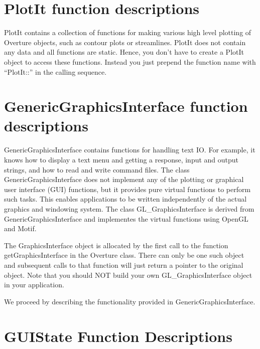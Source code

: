 \documentclass{article}
\begin{document}
\clearpage %

\vfill\eject
\section{PlotIt function descriptions}

PlotIt contains a collection of functions for making various high
level plotting of Overture objects,
such as contour plots or streamlines. PlotIt does not contain any data
and all functions are static. Hence, you don't have to create a PlotIt
object to access these functions. Instead you just prepend the
function name with ``PlotIt::'' in the calling sequence.



\vfill\eject
\section{GenericGraphicsInterface function descriptions}

GenericGraphicsInterface contains functions for handling text IO. For
example, it knows how to display a text menu and getting a response,
input and output strings, and how to read and write command files. The
class GenericGraphicsInterface does not implement any of the plotting
or graphical user interface (GUI) functions, but it provides pure
virtual functions to perform such tasks. This enables applications to
be written independently of the actual graphics and windowing
system. The class GL\_GraphicsInterface is derived from
GenericGraphicsInterface and implementes the virtual functions using
OpenGL and Motif.

The GraphicsInterface object is allocated by the first call to the function
getGraphicsInterface in the Overture class. There can only be one such
object and subsequent calls to that function will just return a
pointer to the original object. Note that you should NOT build your
own GL\_GraphicsInterface object in your application.

We proceed by describing the functionality provided in GenericGraphicsInterface.




\vfill\eject
\section{GUIState Function Descriptions}
\end{document}
